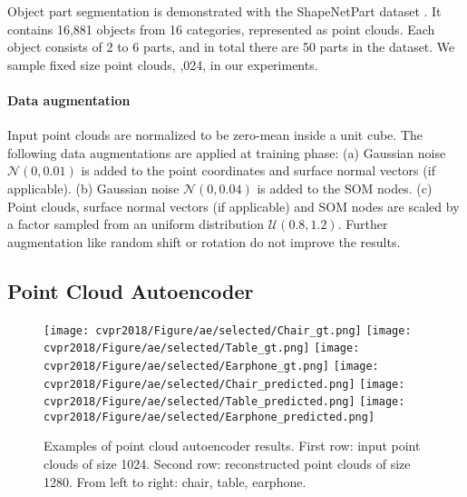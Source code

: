 \documentclass[10pt,twocolumn,letterpaper]{article}
\begin{document}
Object part segmentation is demonstrated with the ShapeNetPart dataset \cite{yi2016scalable}. It contains 16,881 objects from 16 categories, represented as point clouds. Each object consists of 2 to 6 parts, and in total there are 50 parts in the dataset. We sample fixed size point clouds, ,024, in our experiments.

\paragraph{Data augmentation}
Input point clouds are normalized to be zero-mean inside a unit cube. The following data augmentations are applied at training phase: (a) Gaussian noise $\mathcal{N}(0, 0.01)$ is added to the point coordinates and surface normal vectors (if applicable). (b) Gaussian noise $\mathcal{N}(0, 0.04)$ is added to the SOM nodes. (c) Point clouds, surface normal vectors (if applicable) and SOM nodes are scaled by a factor sampled from an uniform distribution $\mathcal{U}(0.8, 1.2)$. Further augmentation like random shift or rotation do not improve the results.

\subsection{Point Cloud Autoencoder} \label{sec_exp_ae}
%
\begin{figure}[h]
        \centering
        \texttt{[image: cvpr2018/Figure/ae/selected/Chair\_gt.png]}
        \texttt{[image: cvpr2018/Figure/ae/selected/Table\_gt.png]}
        \texttt{[image: cvpr2018/Figure/ae/selected/Earphone\_gt.png]}
        \texttt{[image: cvpr2018/Figure/ae/selected/Chair\_predicted.png]}
        \texttt{[image: cvpr2018/Figure/ae/selected/Table\_predicted.png]}
        \texttt{[image: cvpr2018/Figure/ae/selected/Earphone\_predicted.png]}
        \caption{Examples of point cloud autoencoder results. First row: input point clouds of size 1024. Second row: reconstructed point clouds of size 1280. From left to right: chair, table, earphone.}
        \label{fig_ae_selected}
        \vspace{-4pt}
\end{figure}
%
\end{document}
